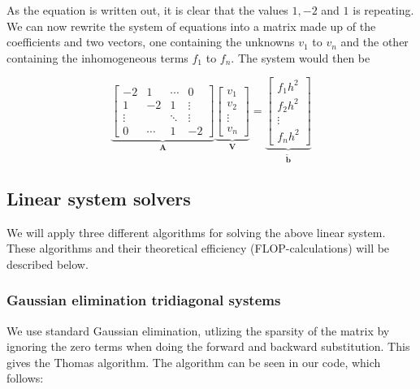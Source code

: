 \documentclass{article}
\begin{document}
As the equation is written out, it is clear that the values $1, -2$ and $1$ is repeating. We can now rewrite the system of equations into a matrix made up of the coefficients and two vectors, one containing the unknowns $v_1$ to $v_{n}$ and the other containing the inhomogeneous terms $f_1$ to $f_{n}$. The system would then be 

\begin{equation}
\underbrace{\begin{bmatrix} -2 & 1 & \cdots & 0 \\ 1 & -2 & 1 & \vdots \\
\vdots & &  \ddots & \vdots \\ 
0 & \cdots & 1 & -2 \end{bmatrix}}_{\mathbf{A}} 
\underbrace{\begin{bmatrix} v_1\\ v_2 \\ \vdots\\ v_n \end{bmatrix}}_{\mathbf{V}} = 
\underbrace{\begin{bmatrix} f_1 h^2\\ f_2 h^2 \\ \vdots \\ f_nh^2\end{bmatrix}}_{\mathbf{\tilde{b}}}
\end{equation}

\subsection{Linear system solvers}
We will apply three different algorithms for solving the above linear system. These algorithms and their theoretical efficiency (FLOP-calculations) will be described below.

\subsubsection{Gaussian elimination tridiagonal systems}
We use standard Gaussian elimination, utlizing the sparsity of the matrix by ignoring the zero terms when doing the forward and backward substitution. This gives the Thomas algorithm. The algorithm can be seen in our code, which follows:
\end{document}
